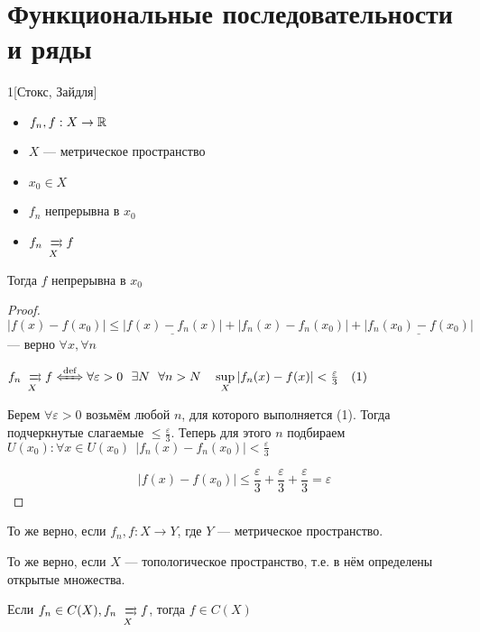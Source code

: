 \section*{Функциональные последовательности и ряды}

\begin{manualtheorem}{1}[Стокс, Зайдля]\itemfix
    \begin{itemize}
        \item $f_n, f : X\to\mathbb{R}$
        \item $X$ --- метрическое пространство
        \item $x_0\in X$
        \item $f_n$ непрерывна в $x_0$
        \item $f_n\xrightrightarrows[X]{} f$
    \end{itemize}
    Тогда $f$ непрерывна в $x_0$
\end{manualtheorem}
\begin{proof}
    $|f(x) - f(x_0)| \le \underline{|f(x) - f_n(x)|} + |f_n(x) - f_n(x_0)| + \underline{|f_n(x_0) - f(x_0)|}$ --- верно $\forall x, \forall n$

    $f_n\xrightrightarrows[X]{} f \xLeftrightarrow{\text{def}} \forall \varepsilon > 0 \ \ \exists N \ \ \forall n > N \quad \sup\limits_X |f_n(x) - f(x)| < \frac{\varepsilon}{3} \quad \text{(1)}$

    Берем $\forall \varepsilon > 0$ возьмём любой $n$, для которого выполняется (1). Тогда подчеркнутые слагаемые $\le \frac{\varepsilon}{3}$. Теперь для этого $n$ подбираем $U(x_0) : \forall x \in U(x_0) \ \ |f_n(x) - f_n(x_0)| < \frac{\varepsilon}{3}$

    $$|f(x) - f(x_0)| \le \frac{\varepsilon}{3} + \frac{\varepsilon}{3} + \frac{\varepsilon}{3} = \varepsilon$$
\end{proof}

\begin{remark}
    То же верно, если $f_n, f : X \to Y$, где $Y$ --- метрическое пространство.
\end{remark}

\begin{remark}
    То же верно, если $X$ --- топологическое пространство, т.е. в нём определены открытые множества.
\end{remark}

\begin{corollary}
    Если $f_n\in C(X), f_n\xrightrightarrows[X]{} f$, тогда $f\in C(X)$
\end{corollary}

